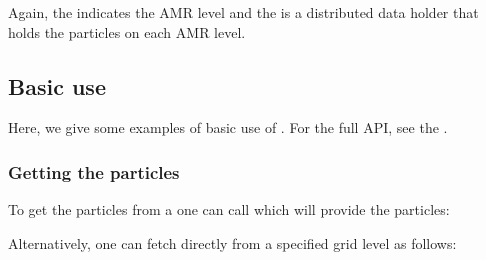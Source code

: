 \documentclass[letterpaper,10pt,english]{sphinxmanual}
\begin{document}
\sphinxAtStartPar
Again, the  indicates the AMR level and the  is a distributed data holder that holds the particles on each AMR level.


\subsection{Basic use}
\label{\detokenize{Source/Particles:basic-use}}
\sphinxAtStartPar
Here, we give some examples of basic use of .
For the full API, see the .


\subsubsection{Getting the particles}
\label{\detokenize{Source/Particles:getting-the-particles}}
\sphinxAtStartPar
To get the particles from a  one can call  which will provide the particles:

\begin{sphinxVerbatim}[commandchars=\\\{\},formatcom=\scriptsize]
 

   
\end{sphinxVerbatim}

\sphinxAtStartPar
Alternatively, one can fetch directly from a specified grid level as follows:

\begin{sphinxVerbatim}[commandchars=\\\{\},formatcom=\scriptsize]
 
 

   \PYG{p}{[}\PYG{p}{]}
\end{sphinxVerbatim}
\end{document}
